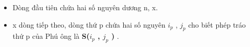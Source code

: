 \begin{itemize}
	\item Dòng đầu tiên chứa hai số nguyên dương n, x.
	\item x dòng tiếp theo, dòng thứ p chứa hai số nguyên $i_{p}$ , $j_{p}$ cho biết phép tráo thứ p của Phú ông là \textbf{ S($i_{p}$ , $j_{p}$ ) } .
\end{itemize}